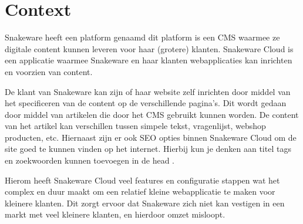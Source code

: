 \section{Context}
Snakeware heeft een platform genaamd  dit platform is een \gls{CMS} waarmee ze digitale content kunnen leveren voor haar (grotere) klanten.
Snakeware Cloud is een applicatie waarmee Snakeware en haar klanten webapplicaties kan inrichten en voorzien van content.

\whitespace[2]
De klant van Snakeware kan zijn of haar website zelf inrichten door middel van het specificeren van de content op de verschillende pagina’s.
Dit wordt gedaan door middel van artikelen die door het \gls{CMS} gebruikt kunnen worden.
De content van het artikel kan verschillen tussen simpele tekst, vragenlijst, webshop producten, etc.
Hiernaast zijn er ook \gls{SEO} opties binnen Snakeware Cloud om de site goed te kunnen vinden op het internet.
Hierbij kun je denken aan titel tags en zoekwoorden kunnen toevoegen in de head \Parencite{HTMLhead}.

\whitespace[2]
Hierom heeft Snakeware Cloud veel features en configuratie stappen wat het complex en duur maakt om een relatief kleine webapplicatie te maken voor kleinere klanten.
Dit zorgt ervoor dat Snakeware zich niet kan vestigen in een markt met veel kleinere klanten, en hierdoor omzet misloopt.
